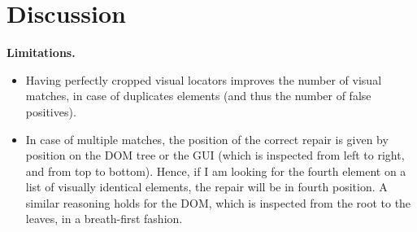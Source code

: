\section{Discussion}\label{sec:discussion}

\textbf{Limitations.} 

\begin{itemize}
\item Having perfectly cropped visual locators improves the number of visual matches, in case of duplicates elements (and thus the number of false positives).
\item In case of multiple matches, the position of the correct repair is given by position on the DOM tree or the GUI (which is inspected from left to right, and from top to bottom). Hence, if I am looking for the fourth element on a list of visually identical elements, the repair will be in fourth position. A similar reasoning holds for the DOM, which is inspected from the root to the leaves, in a breath-first fashion.
\end{itemize}

